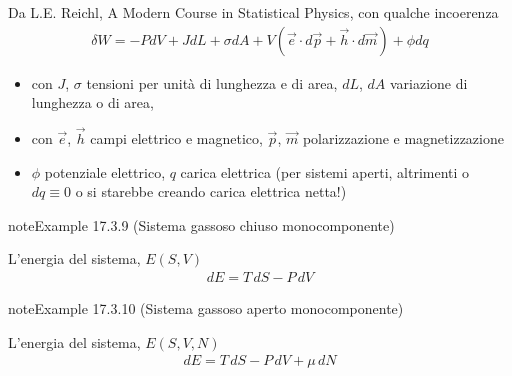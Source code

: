 \documentclass[letterpaper,10pt,italian]{jupyterBook}
\begin{document}
\sphinxAtStartPar
Da L.E. Reichl, A Modern Course in Statistical Physics, con qualche incoerenza  
\begin{equation*}
\begin{split}\delta W = - P dV + J dL + \sigma d A + V \left( \vec{e} \cdot d \vec{p} + \vec{h} \cdot d \vec{m}\right) + \phi d q \end{split}
\end{equation*}\begin{itemize}
\item {} 
\sphinxAtStartPar
con \(J\), \(\sigma\) tensioni per unità di lunghezza e di area, \(d L \), \(d A\) variazione di lunghezza o di area,

\item {} 
\sphinxAtStartPar
con \(\vec{e}\), \(\vec{h}\) campi elettrico e magnetico, \(\vec{p}\), \(\vec{m}\) polarizzazione e magnetizzazione

\item {} 
\sphinxAtStartPar
\(\phi\) potenziale elettrico, \(q\) carica elettrica (per sistemi aperti, altrimenti o \(dq \equiv 0\) o si starebbe creando carica elettrica netta!)

\end{itemize}
\label{ch/thermodynamics/principles-gibbs-phase-rule:example-12}
\begin{sphinxadmonition}{note}{Example 17.3.9 (Sistema gassoso chiuso monocomponente)}



\sphinxAtStartPar
L’energia del sistema, \(E(S,V)\)
\begin{equation*}
\begin{split}dE = T \, dS - P \, dV\end{split}
\end{equation*}\end{sphinxadmonition}
\label{ch/thermodynamics/principles-gibbs-phase-rule:example-13}
\begin{sphinxadmonition}{note}{Example 17.3.10 (Sistema gassoso aperto monocomponente)}



\sphinxAtStartPar
L’energia del sistema, \(E(S,V,N)\)
\begin{equation*}
\begin{split}dE = T \, dS - P \, dV + \mu \, dN\end{split}
\end{equation*}\end{sphinxadmonition}
\label{ch/thermodynamics/principles-gibbs-phase-rule:example-14}
\end{document}
